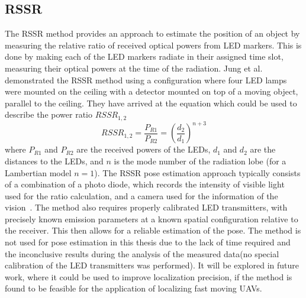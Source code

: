 \subsection{RSSR}

The \ac{RSSR} method provides an approach to estimate the position of an object by measuring the relative ratio of received optical powers from \ac{LED}
markers. This is done by making each of the \ac{LED} markers radiate in their assigned time slot, measuring their optical powers at the time of the
radiation. Jung et al.~\cite{sooyongrssr} demonstrated the \ac{RSSR} method using a configuration where four LED lamps were mounted on the ceiling
with a detector mounted on top of a moving object, parallel to the ceiling.
They have arrived at the equation  which could be used to describe the power ratio $RSSR_{1,2}$
\begin{equation}
RSSR_{1,2} = \frac{P_{R1}}{P_{R2}} = \left( \frac{d_2}{d_1} \right)^{n+3}
\label{eq:rssr}
\end{equation}
where $P_{R1}$ and $P_{R2}$ are the received powers of the \ac{LED}s, $d_1$ and $d_2$ are the distances to the \ac{LED}s, and $n$ is the mode number of the radiation lobe (for a Lambertian model $n = 1$).
The \ac{RSSR} pose estimation approach typically consists of a combination of a photo diode, which records the intensity of visible light used for the ratio
calculation, and a camera used for the information of the vision~\cite{bai2020highcoveragecameraassisted}.
The method also requires properly calibrated \ac{LED} transmitters, with precisely known emission parameters at a known spatial configuration relative
to the receiver. This then allows for a reliable estimation of the pose.
The method is not used for pose estimation in this thesis due to the lack of time required and the inconclusive results during the analysis of
the measured data(no special calibration of the \ac{LED} transmitters was performed).
It will be explored in future work, where it could be used to improve localization precision, if the method is found to be feasible for the application
of localizing fast moving \ac{UAV}s.

